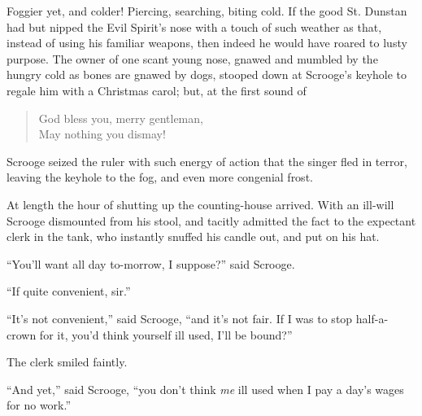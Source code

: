 \documentclass[paper=5.5in:8.5in,BCOR=15mm,twoside,DIV=15,headinclude=off,12pt,chapterprefix=off,openany,headings=huge]{scrbook} %
\begin{document}
Foggier yet, and colder! Piercing, searching, biting cold. If the good St. Dunstan had but nipped the Evil Spirit's nose with a touch of such weather as that, instead of using his familiar weapons, then indeed he would have roared to lusty purpose. The owner of one scant young nose, gnawed and mumbled by the hungry cold as bones are gnawed by dogs, stooped down at Scrooge's keyhole to regale him with a Christmas carol; but, at the first sound of 
\blockquote{God bless you, merry gentleman,\\
May nothing you dismay!}

Scrooge seized the ruler with such energy of action that the singer fled in terror, leaving the keyhole to the fog, and even more congenial frost.

At length the hour of shutting up the counting-house arrived. With an ill-will Scrooge dismounted from his stool, and tacitly admitted the fact to the expectant clerk in the tank, who instantly snuffed his candle out, and put on his hat.

\enquote{You'll want all day to-morrow, I suppose?} said Scrooge.

\enquote{If quite convenient, sir.}

\enquote{It's not convenient,} said Scrooge, \enquote{and it's not fair. If I was to stop half-a-crown for it, you'd think yourself ill used, I'll be bound?}

The clerk smiled faintly.

\enquote{And yet,} said Scrooge, \enquote{you don't think \textit{me} ill used when I pay a day's wages for no work.}
\end{document}
